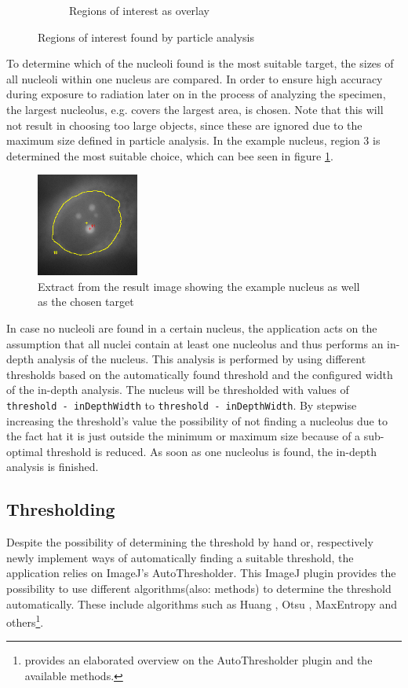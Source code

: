 \documentclass[a4paper, 12pt]{article}
\newcommand{\code}[1]{\colorbox{codegray}{\texttt{#1}}}
\begin{document}
\begin{figure}[h]
\begin{subfigure}[b]{0.25\textwidth}
\caption{Regions of interest as overlay}
\end{subfigure}
\caption{Regions of interest found by particle analysis}
\end{figure}

To determine which of the nucleoli found is the most suitable target, the sizes
of all nucleoli within one nucleus are compared. In order to ensure high
accuracy during exposure to radiation later on in the process of analyzing the
specimen, the largest nucleolus, e.g. covers the largest area, is chosen. Note
that this will not result in choosing too large objects, since these are ignored
due to the maximum size defined in particle analysis. In the example nucleus,
region 3 is determined the most suitable choice, which can bee seen in figure
\ref{fig:example_nucleus_target}. 

\begin{figure}
\centering
\includegraphics[width=0.3\textwidth]{images/example_nucleus_target}
\caption{Extract from the result image showing the example nucleus as well as
the chosen target}
\label{fig:example_nucleus_target}
\end{figure}

In case no nucleoli are found in a certain nucleus, the application acts on the
assumption that all nuclei contain at least one nucleolus and thus performs an
in-depth analysis of the nucleus. This analysis is performed by using different
thresholds based on the automatically found threshold and the configured width
of the in-depth analysis. The nucleus will be thresholded with values of
\code{threshold - inDepthWidth} to \code{threshold - inDepthWidth}. By
stepwise increasing the threshold's value the possibility of not finding a
nucleolus due to the fact hat it is just outside the minimum or maximum size
because of a sub-optimal threshold is reduced. As soon as one nucleolus is
found, the in-depth analysis is finished.

\subsection{Thresholding}\label{sec:thresholding}
Despite the possibility of determining the threshold by hand or, respectively
newly implement ways of automatically finding a suitable threshold, the
application relies on ImageJ's AutoThresholder. This ImageJ plugin provides the
possibility to use different algorithms(also: methods) to determine the
threshold automatically.
These include algorithms such as Huang \cite{huang93}, Otsu \cite{green10},
MaxEntropy \cite{fiji04} and others\footnote{\cite{landini13} provides an
elaborated overview on the AutoThresholder plugin and the available methods.}.
\end{document}
